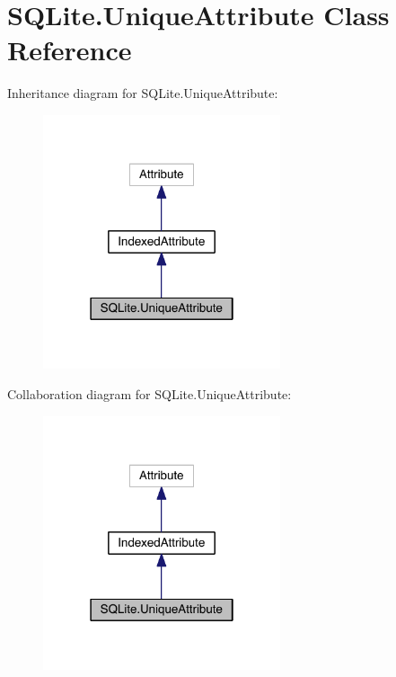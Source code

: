 \hypertarget{class_s_q_lite_1_1_unique_attribute}{\section{S\+Q\+Lite.\+Unique\+Attribute Class Reference}
\label{class_s_q_lite_1_1_unique_attribute}
}


Inheritance diagram for S\+Q\+Lite.\+Unique\+Attribute\+:
\nopagebreak
\begin{figure}[H]
\begin{center}
\leavevmode
\includegraphics[width=198pt]{class_s_q_lite_1_1_unique_attribute__inherit__graph}
\end{center}
\end{figure}


Collaboration diagram for S\+Q\+Lite.\+Unique\+Attribute\+:
\nopagebreak
\begin{figure}[H]
\begin{center}
\leavevmode
\includegraphics[width=198pt]{class_s_q_lite_1_1_unique_attribute__coll__graph}
\end{center}
\end{figure}
